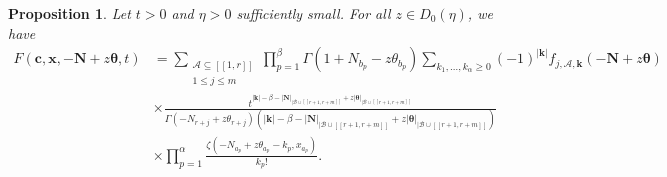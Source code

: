 \documentclass[a4paper]{amsart}
\newtheorem{proposition}[theorem]{Proposition}
\theoremstyle{remark}
\theoremstyle{definition}
\begin{document}
\begin{proposition}
\label{prop:analytic_continuation_directional_F}
Let $t>0$ and $\eta>0$ sufficiently small. For all $z \in D_0(\eta)$, we have
\begin{align}
    F(\mathbf{c},\mathbf{x},-\mathbf{N}+z\bm{\theta},t)& = \sum_{\substack{\mathcal{A} \subseteq [\![1,r]\!] \\ 1 \leq j \leq m}} \prod_{p=1}^{\beta} \Gamma(1+N_{b_p}-z\theta_{b_p}) \sum_{k_1,\ldots,k_{\alpha}\geq 0} (-1)^{|\mathbf{k}|} f_{j,\mathcal{A},\mathbf{k}}(-\mathbf{N}+z\bm{\theta}) \nonumber \\
    & \times \frac{t^{|\mathbf{k}|-\beta-|\mathbf{N}|_{|\mathcal{B}\cup [\![ r+1,r+m ]\!]}+z|\bm{\theta}|_{|\mathcal{B}\cup [\![ r+1,r+m ]\!]}}}{\Gamma(-N_{r+j}+z\theta_{r+j})(|\mathbf{k}|-\beta-|\mathbf{N}|_{|\mathcal{B}\cup [\![ r+1,r+m ]\!]}+z|\bm{\theta}|_{|\mathcal{B}\cup [\![ r+1,r+m ]\!]})} \nonumber \\
    & \times \prod_{p=1}^{\alpha} \frac{\zeta(-N_{a_p}+z\theta_{a_p}-k_p,x_{a_p})}{k_p!}. \label{eq:analytic_continuation_directional_F}
\end{align}
\end{proposition}
\end{document}
